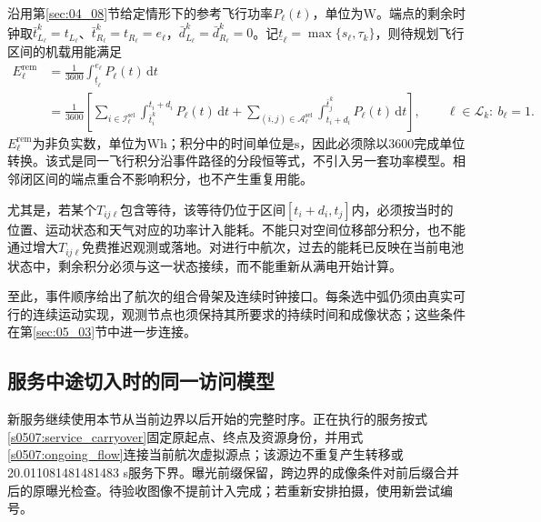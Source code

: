 沿用第\ref{sec:04_08}节给定情形下的参考飞行功率$P_\ell(t)$，单位为$\mathrm W$。端点的剩余时钟取$\bar t_{L_\ell}^k=t_{L_\ell}$、$\bar t_{R_\ell}^k=t_{R_\ell}=e_\ell$，$\bar d_{L_\ell}^k=\bar d_{R_\ell}^k=0$。记$\underline t_\ell=\max\{s_\ell,\tau_k\}$，则待规划飞行区间的机载用能满足
\begin{equation}
 \begin{split}
 E_\ell^{\mathrm{rem}}
 &=\frac{1}{3600}\int_{\underline t_\ell}^{e_\ell}P_\ell(t)\,\mathrm dt\\
 &=\frac{1}{3600}
 \left[
 \sum_{i\in\mathcal I_\ell^{\mathrm{sel}}}
   \int_{\bar t_i^k}^{t_i+d_i}P_\ell(t)\,\mathrm dt
 +\sum_{(i,j)\in\mathcal A_\ell^{\mathrm{sel}}}
   \int_{t_i+d_i}^{\bar t_j^k}P_\ell(t)\,\mathrm dt
 \right],
 \qquad \ell\in\mathcal L_k:\ b_\ell=1.
 \end{split}
 \label{s0502:energy_partition}
\end{equation}
$E_\ell^{\mathrm{rem}}$为非负实数，单位为$\mathrm{Wh}$；积分中的时间单位是$\mathrm{s}$，因此必须除以$3600$完成单位转换。该式是同一飞行积分沿事件路径的分段恒等式，不引入另一套功率模型。相邻闭区间的端点重合不影响积分，也不产生重复用能。

尤其是，若某个$T_{ij\ell}$包含等待，该等待仍位于区间$[t_i+d_i,t_j]$内，必须按当时的位置、运动状态和天气对应的功率计入能耗。不能只对空间位移部分积分，也不能通过增大$T_{ij\ell}$免费推迟观测或落地。对进行中航次，过去的能耗已反映在当前电池状态中，剩余积分必须与这一状态接续，而不能重新从满电开始计算。

至此，事件顺序给出了航次的组合骨架及连续时钟接口。每条选中弧仍须由真实可行的连续运动实现，观测节点也须保持其所要求的持续时间和成像状态；这些条件在第\ref{sec:05_03}节中进一步连接。

\subsection{服务中途切入时的同一访问模型}
新服务继续使用本节从当前边界以后开始的完整时序。正在执行的服务按式\eqref{s0507:service_carryover}固定原起点、终点及资源身份，并用式\eqref{s0507:ongoing_flow}连接当前航次虚拟源点；该源边不重复产生转移或20.011081481481483 s服务下界。曝光前缀保留，跨边界的成像条件对前后缀合并后的原曝光检查。待验收图像不提前计入完成；若重新安排拍摄，使用新尝试编号。
